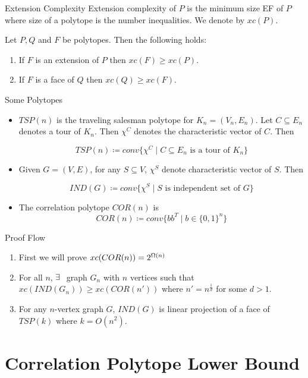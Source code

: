 \documentclass[aspectratio=1610]{beamer}
\begin{document}
\begin{frame}{Extension Complexity}
	Extension complexity of $P$ is the minimum size  EF of $P$ where size of a polytope is the number inequalities. We denote by $xc(P)$.\pause\vspace*{1cm}

	\begin{lemma}
		Let $P,Q$ and $F$ be polytopes. Then the following holds:
		\begin{enumerate}[label=(\roman*)]
			\item If $F$ is an extension of $P$ then $xc(F)\geq xc(P)$.
			\item If $F$ is a face of $Q$ then $xc(Q)\geq xc(F)$.
		\end{enumerate}
	\end{lemma}
\end{frame}
\begin{frame}{Some Polytopes}

	\begin{itemize}
		\item $TSP(n)$ is the traveling salesman polytope for $K_n=(V_n,E_n)$. Let $C\subseteq E_n$ denotes a tour of $K_n$. Then $\chi^C$ denotes the characteristic vector of $C$. Then \pause
		
		$$TSP(n)\coloneqq conv\{\chi^C\mid C\subseteq E_n\text{ is a tour of $K_n$}\}$$\pause

		\item Given $G=(V,E)$, for any $S\subseteq V$, $\chi^S$ denote characteristic vector of $S$. Then\pause
		
		$$IND(G)\coloneqq conv\{\chi^S\mid S\text{ is independent set of $G$}\}$$
		\item The correlation polytope $COR(n)$ is $$COR(n)\coloneqq conv\{bb^T\mid b\in\{0,1\}^n\}$$
	\end{itemize}
\end{frame}
\begin{frame}{Proof Flow}
	\begin{enumerate}[label=Step \arabic*:]
		\item First we will prove $xc(COR(n))=2^{\Omega(n)}$\pause \vspace*{5mm}
	
		\item For all $n$, $\exists\ $ graph $G_n$ with $n$ vertices such that $xc(IND(G_n))\geq xc(COR(n'))$ where $n'=n^{\frac1d}$ for some $d>1$.\pause\vspace*{5mm}
		 
		\item For any $n$-vertex graph $G$, $IND(G)$ is linear projection of a face of $TSP(k)$ where $k=O(n^2)$. 
	\end{enumerate}
\end{frame}
\section{Correlation Polytope Lower Bound}
\end{document}
